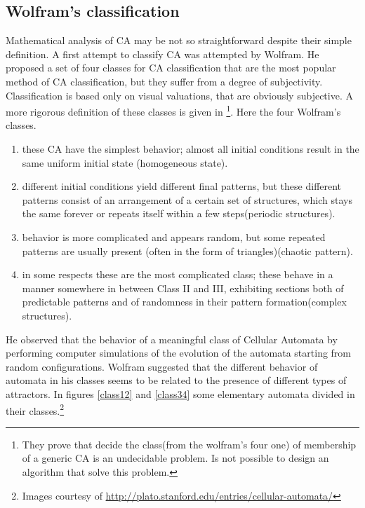 \subsection{Wolfram's classification}
Mathematical analysis of CA may be not so straightforward despite their simple
definition. A first attempt to classify CA was attempted by
Wolfram\cite{wolfram2002}. He proposed a set of four classes for CA
classification that are the most popular method of CA classification, but they
suffer from a degree of subjectivity. Classification is based only on visual
valuations, that are obviously subjective. A more rigorous definition of these
classes is given in \footnote{They prove that decide the class(from the
wolfram's four one) of membership of a generic CA is an undecidable problem. Is
not possible to design an algorithm that solve this problem.}\cite{culik1998}.
Here the four Wolfram's classes.
\begin{enumerate}
  
  \item these CA have the simplest behavior; almost all initial conditions
  result in the same uniform initial state (homogeneous state).
  \item different initial conditions yield different final patterns, but
  these different patterns consist of an arrangement of a certain set of
  structures, which stays the same forever or repeats itself within a few
  steps(periodic structures).
  \item behavior is more complicated and appears random, but some repeated
  patterns are usually present (often in the form of triangles)(chaotic pattern).
  \item in some respects these are the most complicated class; these behave
  in a manner somewhere in between Class II and III, exhibiting sections
  both of predictable patterns and of randomness in their pattern
  formation(complex structures).
\end{enumerate}
He observed that the behavior of a meaningful class of Cellular Automata
by performing computer simulations of the evolution of the automata starting
from random configurations. Wolfram suggested that the different behavior of
automata in his classes seems to be related to the presence of different types
of attractors. In figures \ref{class12} and \ref{class34} some elementary automata divided in their classes.\footnote{Images courtesy of
\url{http://plato.stanford.edu/entries/cellular-automata/}}

